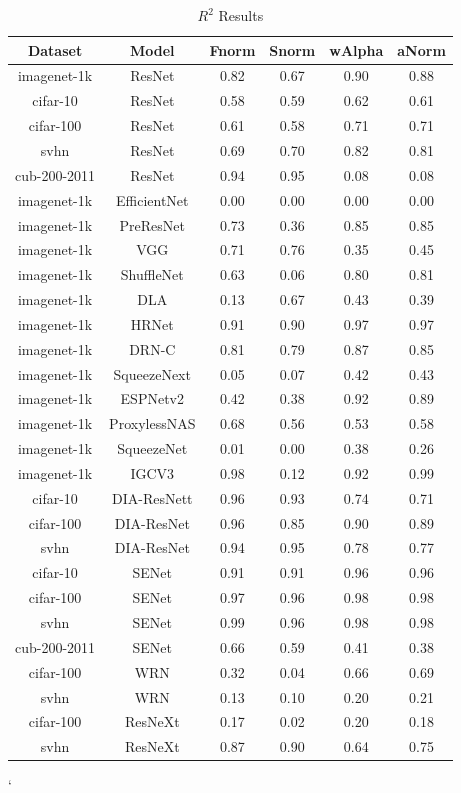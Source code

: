 \begin{table}[t]
\small
\begin{center}
\begin{tabular}{|c|c|c|c|c|c|}
Dataset & Model & Fnorm & Snorm & wAlpha & aNorm \\
\hline
imagenet-1k & ResNet  & 0.82 &  0.67 & 0.90 & 0.88 \\
 cifar-10 & ResNet  & 0.58 &  0.59 & 0.62 & 0.61 \\
 cifar-100 & ResNet  & 0.61 &  0.58 & 0.71 & 0.71 \\
 svhn & ResNet  & 0.69 &  0.70 & 0.82 & 0.81 \\
 cub-200-2011 & ResNet  & 0.94 &  0.95 & 0.08 & 0.08 \\
 imagenet-1k & EfficientNet  & 0.00 &  0.00 & 0.00 & 0.00 \\
 imagenet-1k & PreResNet  & 0.73 &  0.36 & 0.85 & 0.85 \\
 imagenet-1k & VGG  & 0.71 &  0.76 & 0.35 & 0.45 \\
 imagenet-1k & ShuffleNet  & 0.63 &  0.06 & 0.80 & 0.81 \\
 imagenet-1k & DLA  & 0.13 &  0.67 & 0.43 & 0.39 \\
 imagenet-1k & HRNet  & 0.91 &  0.90 & 0.97 & 0.97 \\
 imagenet-1k & DRN-C  & 0.81 &  0.79 & 0.87 & 0.85 \\
 imagenet-1k & SqueezeNext  & 0.05 &  0.07 & 0.42 & 0.43 \\
 imagenet-1k & ESPNetv2  & 0.42 &  0.38 & 0.92 & 0.89 \\
 imagenet-1k & ProxylessNAS  & 0.68 &  0.56 & 0.53 & 0.58 \\
 imagenet-1k & SqueezeNet  & 0.01 &  0.00 & 0.38 & 0.26 \\
 imagenet-1k & IGCV3  & 0.98 &  0.12 & 0.92 & 0.99 \\
 cifar-10 & DIA-ResNett  & 0.96 &  0.93 & 0.74 & 0.71 \\
 cifar-100 & DIA-ResNet  & 0.96 &  0.85 & 0.90 & 0.89 \\
 svhn & DIA-ResNet  & 0.94 &  0.95 & 0.78 & 0.77 \\
 cifar-10 & SENet  & 0.91 &  0.91 & 0.96 & 0.96 \\
 cifar-100 & SENet  & 0.97 &  0.96 & 0.98 & 0.98 \\
 svhn & SENet & 0.99 &  0.96 & 0.98 & 0.98 \\
 cub-200-2011 & SENet  & 0.66 &  0.59 & 0.41 & 0.38 \\
 cifar-100 & WRN  & 0.32 &  0.04 & 0.66 & 0.69 \\
 svhn & WRN  & 0.13 &  0.10 & 0.20 & 0.21 \\
 cifar-100 & ResNeXt  & 0.17 &  0.02 & 0.20 & 0.18 \\
 svhn & ResNeXt  & 0.87 &  0.90 & 0.64 & 0.75 \\
\hline
\end{tabular}
\end{center}
\caption{$R^{2}$ Results}
\label{table:R2results}
\end{table}`
